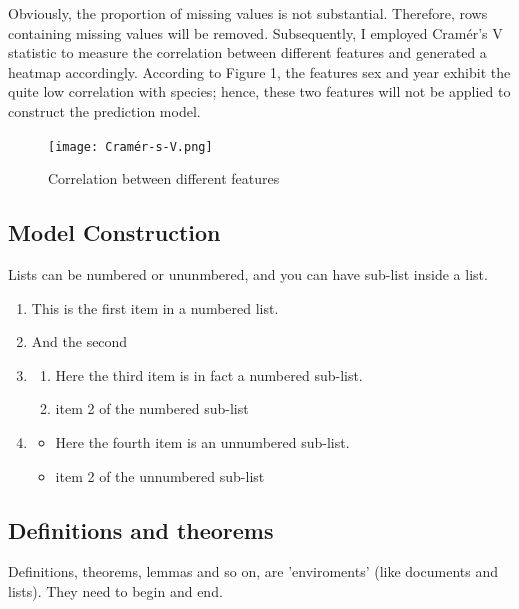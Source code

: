 \documentclass[a4paper,11pt]{article}
\theoremstyle{definition}
\begin{document}
\noindent
Obviously, the proportion of missing values is not substantial. Therefore, rows containing missing values will be removed.
Subsequently, I employed Cramér's V statistic to measure the correlation between different features and generated a heatmap accordingly.
According to Figure 1, the features sex and year exhibit the quite low correlation with species; hence, these two features 
will not be applied to construct the prediction model.


\begin{figure}
    \centering
    \texttt{[image: Cramér-s-V.png]}
    \caption{Correlation between different features}
    \label{fig: }
\end{figure}




\subsection{Model Construction}

Lists can be numbered or ununmbered, and you can have sub-list inside a list.

\begin{enumerate}
	\item This is the first item in a numbered list.

	\item And the second
	
	\item 
	\begin{enumerate}
		\item Here the third item is in fact a numbered sub-list.
		\item item 2 of the numbered sub-list
	\end{enumerate}

	\item 
	\begin{itemize}
		\item Here the fourth item is an unnumbered sub-list.
		\item item 2 of the unnumbered sub-list
	\end{itemize}
\end{enumerate}

\subsection{Definitions and theorems}

Definitions, theorems, lemmas and so on, are 'enviroments' (like documents and lists). They need to begin and end.
\end{document}
